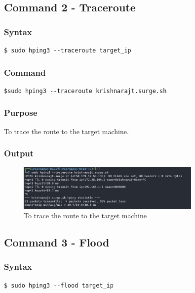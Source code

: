 \documentclass[11pt]{article}
\begin{document}
\subsection{Command 2 - Traceroute}

\subsubsection*{Syntax}
\begin{verbatim}
$ sudo hping3 --traceroute target_ip
\end{verbatim}

\subsubsection*{Command}
\begin{verbatim}
$sudo hping3 --traceroute krishnarajt.surge.sh
\end{verbatim}


\subsubsection*{Purpose}
To trace the route to the target machine.

\subsubsection*{Output}
\begin{figure}[H]
    \centering
    \includegraphics[width=0.8\textwidth]{hping trace.jpg}
    \caption{To trace the route to the target machine}
    \label{fig:2}
\end{figure}

\subsection{Command 3 - Flood}

\subsubsection*{Syntax}
\begin{verbatim}
$ sudo hping3 --flood target_ip
\end{verbatim}
\end{document}
